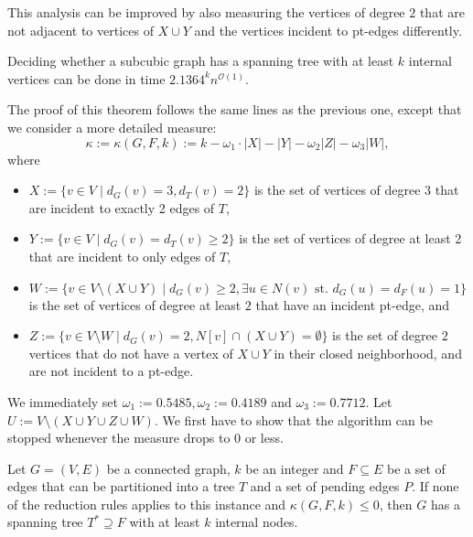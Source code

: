 \documentclass{llncs}
\newcommand{\shortversion}[1]{}
\newcommand{\mc}{\mathcal}
\newcommand{\Oh}{{\mc{O}}}
\newcommand{\rtkii}{2.1364}
\begin{document}
This analysis can be improved by also measuring the vertices of degree $2$ that are not adjacent to vertices of $X \cup Y$ and the vertices incident
to pt-edges differently.
 \shortversion{For reasons of space, we only exhibit the measure we used.}

\begin{theorem}\label{thm:rtkii}
Deciding whether a subcubic graph has a spanning tree with at least $k$ internal vertices can be done in time $\rtkii^k n^{\Oh(1)}$.
\end{theorem}

 The proof of this theorem follows the same lines as the previous one, except that we consider a more detailed measure:
 \[
  \kappa := \kappa(G,F,k) := k - \omega_1 \cdot |X| - |Y| - \omega_2 |Z| - \omega_3 |W|,
 \]
 where
 \begin{itemize}
  \item $X:=\{v\in V \mid d_G(v)=3, d_T(v)=2\}$ is the set of vertices of degree $3$ that are incident to exactly 2 edges of $T$,
  \item $Y:=\{v\in V \mid d_G(v)=d_T(v)\ge 2\}$ is the set of vertices of degree at least 2 that are incident to only edges of $T$,
  \item $W:=\{v\in V\setminus (X \cup Y) \mid d_G(v) \ge 2, \exists u\in N(v) \text{ st. } d_G(u)=d_F(u)=1\}$
is the set of vertices of degree at least $2$ that have an incident pt-edge, and
  \item $Z:=\{v\in V\setminus W \mid d_G(v)=2, N[v] \cap (X \cup Y) = \emptyset\}$ is the set of degree $2$ vertices that do not have a vertex of $X\cup Y$ in their closed neighborhood, and are not incident to a pt-edge.  
\end{itemize}
 We immediately set $\omega_1 :=  0.5485, \omega_2 :=  0.4189$ and $\omega_3 := 0.7712$. 
Let $U:=V\setminus (X \cup Y \cup Z \cup W)$.
We first have to show that the algorithm can be stopped whenever the measure drops to $0$ or less.
\begin{lemma}
 Let $G=(V,E)$ be a connected graph, $k$ be an integer and $F\subseteq E$ be a set of edges that can be partitioned into a tree $T$ and a set of pending edges $P$. If none of the reduction rules applies to this instance and $\kappa(G,F,k) \le 0$, then $G$ has a spanning tree $T^* \supseteq F$ with at least $k$ internal nodes.
\end{lemma}
\end{document}
